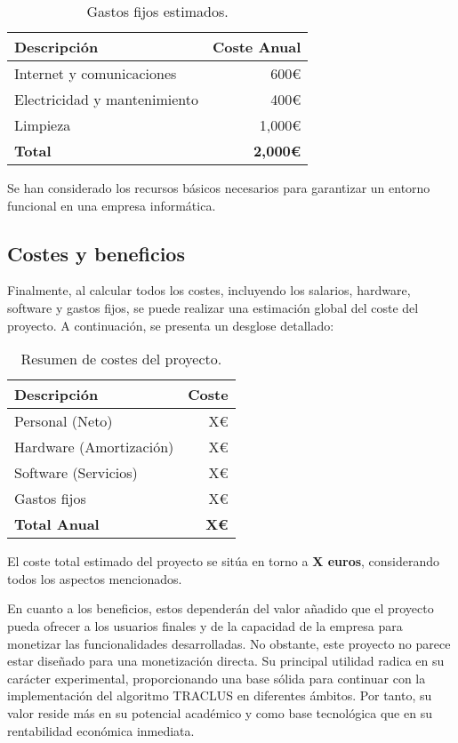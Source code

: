 \begin{table}[H]
\centering
\begin{tabular}{lr}
\toprule
Descripción & Coste Anual \\ 
\midrule
Internet y comunicaciones & 600€ \\
Electricidad y mantenimiento & 400€ \\
Limpieza & 1,000€ \\
\textbf{Total} & \textbf{2,000€} \\ 
\bottomrule
\end{tabular}
\caption{Gastos fijos estimados.}
\end{table}

Se han considerado los recursos básicos necesarios para garantizar un entorno funcional en una empresa informática.

\subsection{Costes y beneficios}

Finalmente, al calcular todos los costes, incluyendo los salarios, hardware, software y gastos fijos, se puede realizar una estimación global del coste del proyecto. A continuación, se presenta un desglose detallado:

\begin{table}[H]
\centering
\begin{tabular}{lr}
\toprule
Descripción & Coste \\ 
\midrule
Personal (Neto) & X€ \\ 
Hardware (Amortización) & X€ \\ 
Software (Servicios) & X€ \\ 
Gastos fijos & X€ \\ 
\textbf{Total Anual} & \textbf{X€} \\ 
\bottomrule
\end{tabular}
\caption{Resumen de costes del proyecto.}
\end{table}

El coste total estimado del proyecto se sitúa en torno a \textbf{X euros}, considerando todos los aspectos mencionados.

En cuanto a los beneficios, estos dependerán del valor añadido que el proyecto pueda ofrecer a los usuarios finales y de la capacidad de la empresa para monetizar las funcionalidades desarrolladas. No obstante, este proyecto no parece estar diseñado para una monetización directa. Su principal utilidad radica en su carácter experimental, proporcionando una base sólida para continuar con la implementación del algoritmo TRACLUS en diferentes ámbitos. Por tanto, su valor reside más en su potencial académico y como base tecnológica que en su rentabilidad económica inmediata.

